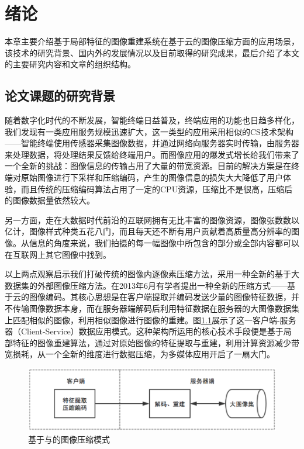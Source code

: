 
\chapter{绪论}
本章主要介绍基于局部特征的图像重建系统在基于云的图像压缩方面的应用场景，该技术的研究背景、国内外的发展情况以及目前取得的研究成果，最后介绍了本文的主要研究内容和文章的组织结构。


\section{论文课题的研究背景}

随着数字化时代的不断发展，智能终端日益普及，终端应用的功能也日趋多样化，我们发现有一类应用服务规模迅速扩大，这一类型的应用采用相似的CS技术架构——智能终端使用传感器采集图像数据，并通过网络向服务器实时传输，由服务器来处理数据，将处理结果反馈给终端用户。而图像应用的爆发式增长给我们带来了一个全新的挑战：图像信息的传输占用了大量的带宽资源。目前的解决方案是在终端对原始图像进行下采样和压缩编码，产生的图像信息的损失大大降低了用户体验，而且传统的压缩编码算法占用了一定的CPU资源，压缩比不是很高，压缩后的图像数据量依然较大。

另一方面，走在大数据时代前沿的互联网拥有无比丰富的图像资源，图像张数数以亿计，图像样式种类五花八门，而且每天还不断有用户贡献着高质量高分辨率的图像。从信息的角度来说，我们拍摄的每一幅图像中所包含的部分或全部内容都可以在互联网上其它图像中找到。

以上两点观察启示我们打破传统的图像内逐像素压缩方法，采用一种全新的基于大数据集的外部图像压缩方法。在2013年6月有学者\cite{Yue:2013gl}提出一种全新的压缩方式——基于云的图像编码。其核心思想是在客户端提取并编码发送少量的图像特征数据，并不传输图像数据本身，而在服务器端解码后利用特征数据在服务器的大图像数据集上匹配相似的图像，利用相似图像进行图像的重建。图\ref{fig:overview}展示了这一客户端-服务器（Client-Service）数据应用模式。这种架构所运用的核心技术手段便是基于局部特征的图像重建算法，通过对原始图像的特征提取与重建，利用计算资源减少带宽损耗，从一个全新的维度进行数据压缩，为多媒体应用开启了一扇大门。

\begin{figure}
\centering\includegraphics[width=14cm]{imgs/ch1/overview}
\caption{基于与的图像压缩模式}
\label{fig:overview}
\end{figure}


